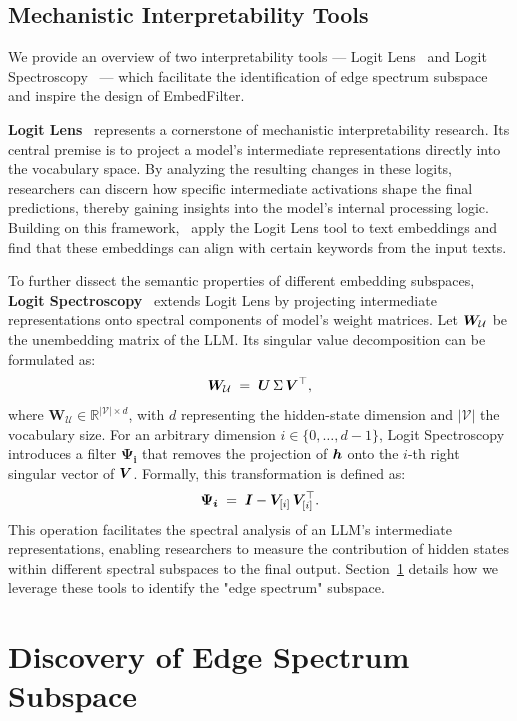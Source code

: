 \documentclass[sigconf]{acmart}
\newcommand{\name}{EmbedFilter}
\begin{document}
\subsection{Mechanistic Interpretability Tools}
We provide an overview of two interpretability tools --- Logit Lens~\cite{logitlens} and Logit Spectroscopy~\cite{spectral} --- which facilitate the identification of edge spectrum subspace and inspire the design of \name.

\textbf{Logit Lens}~\cite{logitlens} represents a cornerstone of mechanistic interpretability research. 
Its central premise is to project a model’s intermediate representations directly into the vocabulary space.
By analyzing the resulting changes in these logits, researchers can discern how specific intermediate activations shape the final predictions, thereby gaining insights into the model's internal processing logic.
Building on this framework, \citet{nie2024text}~apply the Logit Lens tool to text embeddings and find that these embeddings can align with certain keywords from the input texts.

To further dissect the semantic properties of different embedding subspaces, 
\textbf{Logit Spectroscopy}~\citep{spectral} extends Logit Lens by projecting intermediate representations onto spectral components of model’s weight matrices.
Let \({\bm{W}}_\mathcal{U}\) be the unembedding matrix of the LLM. 
Its singular value decomposition can be formulated as:
{ \Large \begin{equation*}
    \label{eq:svd}
    {\bm{W}}_\mathcal{U} \; = \; {\bm{U}} \, \Sigma \, {\bm{V}}^\top,
\end{equation*}}
where \(\bm{W_\mathcal{U}} \in \mathbb{R}^{\left | \mathcal{V}\right | \times d}\), with \(d\) representing the hidden-state dimension and \(|\mathcal{V}|\) the vocabulary size.
For an arbitrary dimension $i \in \{0, \dots, d-1\}$, Logit Spectroscopy introduces a filter \(\bm{\Psi_i}\) that removes the projection of \({\bm{h}}\) onto the \(i\)-th right singular vector of \({\bm{V}}\). 
Formally, this transformation is defined as:
{\Large \[
    {\bm{\Psi_i}} \; = \; {{\bm{I}} - {\bm{V}}_{[i]} \, {\bm{V}}_{[i]}^{\top}}.
\]}
This operation facilitates the spectral analysis of an LLM's intermediate representations, enabling researchers to measure the contribution of hidden states within different spectral subspaces to the final output.
Section~\ref{sec:interpret} details how we leverage these tools to identify the "edge spectrum" subspace.

\section{Discovery of Edge Spectrum Subspace}
\label{sec:interpret}
\end{document}

